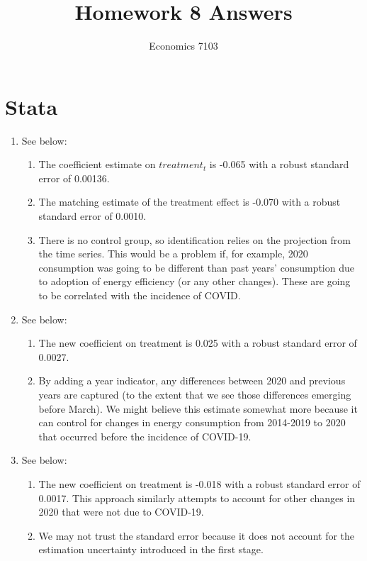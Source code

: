 \documentclass{article}
\title{Homework 8 Answers}
\author{Economics 7103}
\date{ }
\begin{document}
  
\maketitle

\section{Stata}

\begin{enumerate}
    \item See below:
    \begin{enumerate}
        \item The coefficient estimate on \(treatment_t\) is -0.065 with a robust standard error of 0.00136.
        \item The matching estimate of the treatment effect is -0.070 with a robust standard error of 0.0010.
        \item There is no control group, so identification relies on the projection from the time series.  This would be a problem if, for example, 2020 consumption was going to be different than past years' consumption due to adoption of energy efficiency (or any other changes).  These are going to be correlated with the incidence of COVID.
    \end{enumerate}
    \item See below:
    \begin{enumerate}
        \item The new coefficient on treatment is 0.025 with a robust standard error of 0.0027.
        \item By adding a year indicator, any differences between 2020 and previous years are captured (to the extent that we see those differences emerging before March).  We might believe this estimate somewhat more because it can control for changes in energy consumption from 2014-2019 to 2020 that occurred before the incidence of COVID-19.
    \end{enumerate}
    \item See below:
    \begin{enumerate}
        \item The new coefficient on treatment is -0.018 with a robust standard error of 0.0017.  This approach similarly attempts to account for other changes in 2020 that were not due to COVID-19.
        \item We may not trust the standard error because it does not account for the estimation uncertainty introduced in the first stage.
    \end{enumerate}
\end{enumerate}
\end{document}
